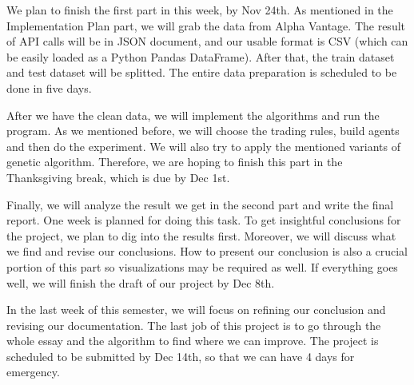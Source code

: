 \documentclass{article}
\begin{document}
We plan to finish the first part in this week, by Nov 24th.
As mentioned in the Implementation Plan part, we will grab the data from Alpha Vantage.
The result of API calls will be in JSON document, and our usable format is CSV
(which can be easily loaded as a Python Pandas DataFrame).
After that, the train dataset and test dataset will be splitted.
The entire data preparation is scheduled to be done in five days.

After we have the clean data, we will implement the algorithms and run the program.
As we mentioned before, we will choose the trading rules, build agents and then do the experiment.
We will also try to apply the mentioned variants of genetic algorithm.
Therefore, we are hoping to finish this part in the Thanksgiving break,
which is due by Dec 1st.

Finally, we will analyze the result we get in the second part and write the final report.
One week is planned for doing this task.
To get insightful conclusions for the project, we plan to dig into the results first.
Moreover, we will discuss what we find and revise our conclusions.
How to present our conclusion is also a crucial portion of this part so visualizations may be required as well.
If everything goes well, we will finish the draft of our project by Dec 8th.

In the last week of this semester, we will focus on refining our conclusion and revising our documentation.
The last job of this project is to go through the whole essay and the algorithm to find where we can improve.
The project is scheduled to be submitted by Dec 14th, so that we can have 4 days for emergency.




\end{document}
